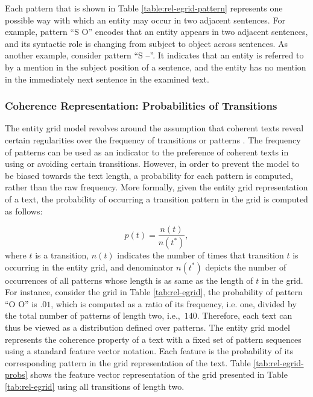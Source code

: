 Each pattern that is shown in Table \ref{table:rel-egrid-pattern} represents one possible way with which an entity may occur in two adjacent sentences. 
For example, pattern ``S O'' encodes that an entity appears in two adjacent sentences, and its syntactic role is changing from subject to object across sentences. 
As another example, consider pattern ``S --''. 
It indicates that an entity is referred to by a mention in the subject position of a sentence, and the entity has no mention in the immediately next sentence in the examined text.  

\subsubsection{Coherence Representation: Probabilities of Transitions}
%
The entity grid model revolves around the assumption that coherent texts reveal certain regularities over the frequency of transitions or patterns \cite{barzilay05a,barzilay08}.    
The frequency of patterns can be used as an indicator to the preference of coherent texts in using or avoiding certain transitions. 
However, in order to prevent the model to be biased towards the text length, a probability for each pattern is computed, rather than the raw frequency. 	 
More formally, given the entity grid representation of a text, the probability of occurring a transition pattern in the grid is computed as follows:

\begin{equation}
p(t) = \frac{n(t)}{n(t^*)},
\end{equation}
where $t$ is a transition, $n(t)$ indicates the number of times that transition $t$ is occurring in the entity grid, and denominator $n(t^*)$ depicts the number of occurrences of all patterns whose length is as same as the length of $t$ in the grid. 
For instance, consider the grid in Table \ref{tab:rel-egrid}, the probability of pattern ``O O'' is $.01$, which is computed as a ratio of its frequency, i.e. one, divided by the total number of patterns of length two, i.e.,\ $140$. 
Therefore, each text can thus be viewed as a distribution defined over patterns. 
The entity grid model represents the coherence property of a text with a fixed set of pattern sequences using a standard feature vector notation.
Each feature is the probability of its corresponding pattern in the grid representation of the text.  
Table \ref{tab:rel-egrid-probs} shows the feature vector representation of the grid presented in Table \ref{tab:rel-egrid} using all transitions of length two. 

